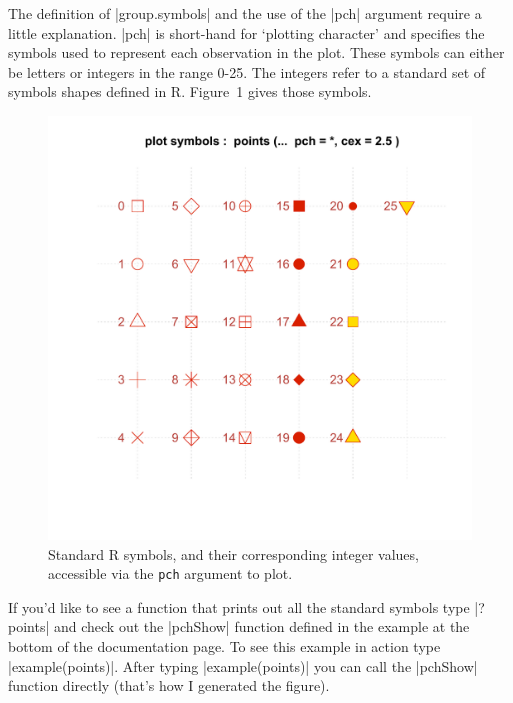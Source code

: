 
The definition of |group.symbols| and the use of the |pch| argument require a little explanation. |pch| is short-hand for `plotting  character' and specifies the symbols used to represent each observation in the plot.  These symbols can either be letters or integers in the range 0-25. The integers refer to a standard set of symbols shapes defined in R. Figure~1 gives those symbols.

\begin{figure}
\begin{center}

\includegraphics[height=0.8\columnwidth]{pch-symbols}

\end{center}
\caption{Standard R symbols, and their corresponding integer values, accessible via the \texttt{pch} argument to plot.}
\end{figure}

If you'd like to see a function that prints out all the standard symbols type |?points| and check out the |pchShow| function defined in the example at the bottom of the documentation page.  To see this example in action type |example(points)|. After typing |example(points)| you can call the |pchShow| function directly (that's how I generated the figure).

